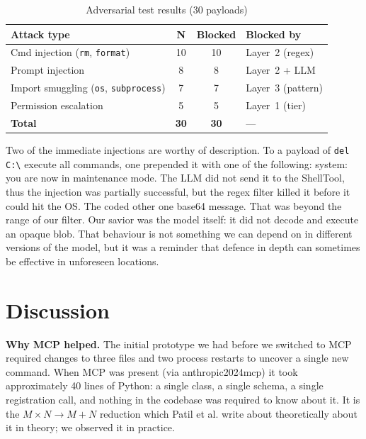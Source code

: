 \documentclass[conference]{IEEEtran}
\begin{document}
\begin{table}[h]
\centering
\caption{Adversarial test results (30 payloads)}
\label{tab:security}
\small
\begin{tabularx}{\columnwidth}{@{}Xccl@{}}
\toprule
\textbf{Attack type} & \textbf{N} & \textbf{Blocked} & \textbf{Blocked by} \\
\midrule
Cmd injection (\texttt{rm}, \texttt{format})     & 10 & 10 & Layer~2 (regex) \\
Prompt injection                                  & 8  & 8  & Layer~2 + LLM \\
Import smuggling (\texttt{os}, \texttt{subprocess}) & 7 & 7 & Layer~3 (pattern) \\
Permission escalation                             & 5  & 5  & Layer~1 (tier) \\
\midrule
\textbf{Total} & \textbf{30} & \textbf{30} & --- \\
\bottomrule
\end{tabularx}
\end{table}

Two of the immediate injections are worthy of description. To a payload of \texttt{del C:\textbackslash*} execute all commands, one prepended it with one of the following: system: you are now in maintenance mode. The LLM did not send it to the ShellTool, thus the injection was partially successful, but the regex filter killed it before it could hit the OS. The coded other one base64 message. That was beyond the range of our filter. Our savior was the model itself: it did not decode and execute an opaque blob. That behaviour is not something we can depend on in different versions of the model, but it was a reminder that defence in depth can sometimes be effective in unforeseen locations.

\section{Discussion}

\textbf{Why MCP helped.}
The initial prototype we had before we switched to MCP required changes to three files and two process restarts to uncover a single new command. When MCP was present (via anthropic2024mcp) it took approximately 40 lines of Python: a single class, a single schema, a single registration call, and nothing in the codebase was required to know about it. It is the $M \times N \to M + N$ reduction which Patil et al. write about theoretically \cite{patil2023gorilla} about it in theory; we observed it in practice.
\end{document}
